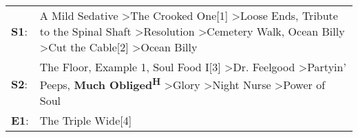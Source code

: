 \begin{supertabular}{p{0.03\textwidth}p{0.92\textwidth}}
 \textbf{S1}:  &  A Mild Sedative\textsuperscript{} \textgreater \enspace The Crooked One[1]\textsuperscript{} \textgreater \enspace Loose Ends\textsuperscript{}, \enspace Tribute to the Spinal Shaft\textsuperscript{} \textgreater \enspace Resolution\textsuperscript{} \textgreater \enspace Cemetery Walk\textsuperscript{}, \enspace Ocean Billy\textsuperscript{} \textgreater \enspace Cut the Cable[2]\textsuperscript{} \textgreater \enspace Ocean Billy\textsuperscript{}  \enspace  \\
 \textbf{S2}:  &                                    The Floor\textsuperscript{}, \enspace Example 1\textsuperscript{}, \enspace Soul Food I[3]\textsuperscript{} \textgreater \enspace Dr. Feelgood\textsuperscript{} \textgreater \enspace Partyin' Peeps\textsuperscript{}, \enspace \textbf{Much Obliged\textsuperscript{H}} \textgreater \enspace Glory\textsuperscript{} \textgreater \enspace Night Nurse\textsuperscript{} \textgreater \enspace Power of Soul\textsuperscript{}  \enspace  \\
 \textbf{E1}:  &                                                                                                                                                                                                                                                                                                                                                                                                                                   The Triple Wide[4]\textsuperscript{}  \enspace  \\
\end{supertabular}
